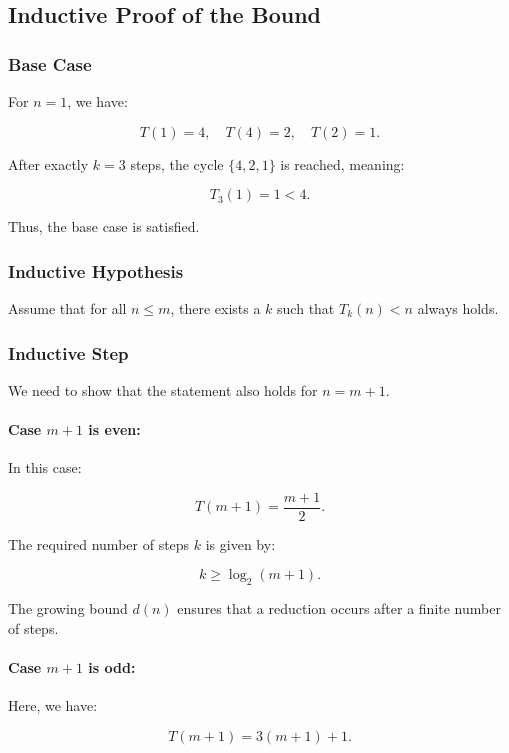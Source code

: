 \documentclass[a4paper,12pt]{article}
\begin{document}
\subsection{Inductive Proof of the Bound}

\subsubsection{Base Case}

For \( n = 1 \), we have:

\[
T(1) = 4, \quad T(4) = 2, \quad T(2) = 1.
\]

After exactly \( k = 3 \) steps, the cycle \( \{4, 2, 1\} \) is reached, meaning:

\[
T_3(1) = 1 < 4.
\]

Thus, the base case is satisfied.

\subsubsection{Inductive Hypothesis}

Assume that for all \( n \leq m \), there exists a \( k \) such that \( T_k(n) < n \) always holds.

\subsubsection{Inductive Step}

We need to show that the statement also holds for \( n = m + 1 \).

\paragraph{Case \( m + 1 \) is even:}

In this case:

\[
T(m + 1) = \frac{m + 1}{2}.
\]

The required number of steps \( k \) is given by:

\[
k \geq \log_2(m + 1).
\]

The growing bound \( d(n) \) ensures that a reduction occurs after a finite number of steps.

\paragraph{Case \( m + 1 \) is odd:}

Here, we have:

\[
T(m + 1) = 3(m + 1) + 1.
\]
\end{document}
